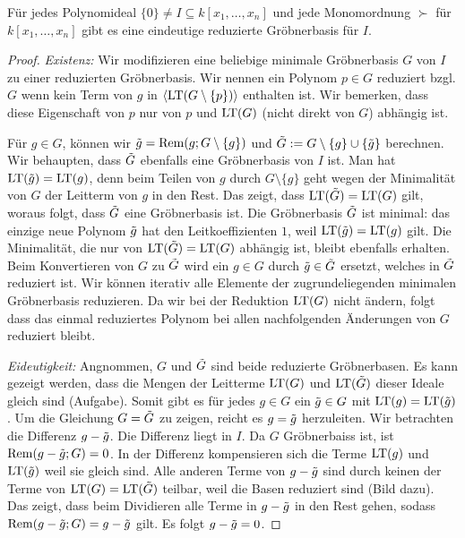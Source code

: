 \documentclass[11pt]{article}
\numberwithin{equation}{section}
\begin{document}
\begin{proposition} 
	Für jedes Polynomideal $\{0\} \ne I \subseteq k[x_1,\ldots,x_n]$ und jede Monomordnung $\succ$ für $k[x_1,\ldots,x_n]$ gibt es eine eindeutige reduzierte Gröbnerbasis für $I$. 
\end{proposition}  
\begin{proof} 
	\emph{Existenz:} Wir modifizieren eine beliebige minimale Gröbnerbasis  $G$  von $I$ zu einer reduzierten Gröbnerbasis. Wir nennen ein Polynom $p \in G$ reduziert bzgl. $G$ wenn kein Term von $g$ in $\left<  \operatorname{LT}(G \setminus \{p\}) \right>$ enthalten ist. Wir bemerken, dass diese Eigenschaft von $p$ nur von $p$ und $\operatorname{LT}(G)$ (nicht direkt von $G$) abhängig ist.  
	
	Für $g \in G$, können wir $\Tilde{g} = \operatorname{Rem}( g; G \setminus \{g\})$ und $\Tilde{G} := G \setminus \{g\} \cup \{\Tilde{g} \}$ berechnen. Wir behaupten, dass $\Tilde{G}$ ebenfalls eine Gröbnerbasis von $I$ ist. Man hat $\operatorname{LT}(\Tilde{g}) = \operatorname{LT}(g)$, denn beim Teilen von $g$ durch $G \setminus \{g\}$ geht wegen der Minimalität von $G$ der Leitterm von $g$ in den Rest. Das zeigt, dass $\operatorname{LT}(\Tilde{G}) = \operatorname{LT}(G)$ gilt, woraus folgt, dass $\Tilde{G}$ eine Gröbnerbasis ist. Die Gröbnerbasis $\Tilde{G}$ ist minimal: das einzige neue Polynom $\Tilde{g}$ hat den Leitkoeffizienten $1$, weil $\operatorname{LT}(\Tilde{g}) = \operatorname{LT}(g)$ gilt. Die Minimalität, die nur von $\operatorname{LT}(\Tilde{G}) = \operatorname{LT}(G)$ abhängig ist, bleibt ebenfalls erhalten. Beim Konvertieren von $G$ zu $\Tilde{G}$ wird ein $g \in G$ durch $\Tilde{g} \in \Tilde{G}$ ersetzt, welches in $\Tilde{G}$ reduziert ist. Wir können iterativ alle Elemente der zugrundeliegenden minimalen Gröbnerbasis reduzieren. Da wir bei der Reduktion $\operatorname{LT}(G)$ nicht ändern, folgt dass das einmal reduziertes Polynom bei allen nachfolgenden Änderungen von $G$ reduziert bleibt. 
	
	\emph{Eideutigkeit:} Angnommen, $G$ und $\Tilde{G}$ sind beide reduzierte Gröbnerbasen. Es kann gezeigt werden, dass die Mengen der Leitterme $\operatorname{LT}(G)$ und $\operatorname{LT}(\Tilde{G})$ dieser Ideale gleich sind (Aufgabe). Somit gibt es für jedes $g \in G$ ein $\Tilde{g} \in G$  mit $\operatorname{LT}(g) = \operatorname{LT}(\Tilde{g})$. Um die Gleichung $G = \Tilde{G}$ zu zeigen, reicht es $g = \Tilde{g}$ herzuleiten. Wir betrachten die Differenz $g - \Tilde{g}$. Die Differenz liegt in $I$. Da $G$ Gröbnerbaiss ist, ist $\operatorname{Rem}(g-\Tilde{g}; G) = 0$. In der Differenz kompensieren sich die Terme $\operatorname{LT}(g)$ und $\operatorname{LT}(\Tilde{g})$ weil sie gleich sind. Alle anderen Terme von $g- \Tilde{g}$ sind durch keinen der Terme von $\operatorname{LT}(G) = \operatorname{LT}(\Tilde{G})$ teilbar, weil die Basen reduziert sind (Bild dazu). Das zeigt, dass beim Dividieren alle Terme in $g -\Tilde{g}$ in den Rest gehen, sodass $\operatorname{Rem}(g-\Tilde{g}; G) = g - \Tilde{g}$ gilt. Es folgt $g-\Tilde{g} = 0$. 
\end{proof} 
\end{document}
